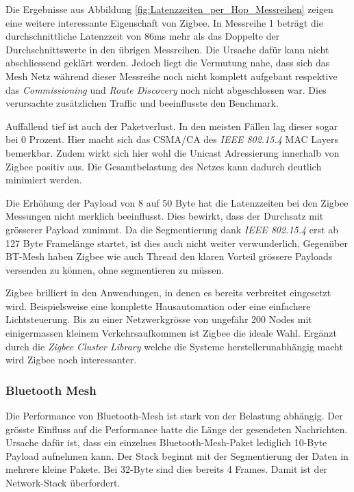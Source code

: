 Die Ergebnisse aus Abbildung \ref{fig:Latenzzeiten_per_Hop_Messreihen} zeigen eine weitere interessante Eigenschaft von Zigbee.
In Messreihe 1 beträgt die durchschnittliche Latenzzeit von 86ms mehr als das Doppelte der Durchschnittswerte in den übrigen Messreihen.
Die Ursache dafür kann nicht abschliessend geklärt werden.
Jedoch liegt die Vermutung nahe, dass sich das Mesh Netz während dieser Messreihe noch nicht komplett aufgebaut respektive das \textit{Commissioning} und \textit{Route Discovery} noch nicht abgeschlossen war.
Dies verursachte zusätzlichen Traffic und beeinflusste den Benchmark.

Auffallend tief ist auch der Paketverlust.
In den meisten Fällen lag dieser sogar bei 0 Prozent.
Hier macht sich das CSMA\slash CA des \textit{IEEE 802.15.4} MAC Layers bemerkbar.
Zudem wirkt sich hier wohl die Unicast Adressierung innerhalb von Zigbee positiv aus.
Die Gesamtbelastung des Netzes kann dadurch deutlich minimiert werden.

Die Erhöhung der Payload von 8 auf 50 Byte hat die Latenzzeiten bei den Zigbee Messungen nicht merklich beeinflusst.
Dies bewirkt, dass der Durchsatz mit grösserer Payload zunimmt.
Da die Segmentierung dank \textit{IEEE 802.15.4} erst ab 127 Byte Framelänge startet, ist dies auch nicht weiter verwunderlich.
Gegenüber BT-Mesh haben Zigbee wie auch Thread den klaren Vorteil grössere Payloads versenden zu können, ohne segmentieren zu müssen.

Zigbee brilliert in den Anwendungen, in denen es bereits verbreitet eingesetzt wird.
Beispielsweise eine komplette Hausautomation oder eine einfachere Lichtsteuerung.
Bis zu einer Netzwerkgrösse von ungefähr 200 Nodes mit einigermassen kleinem Verkehrsaufkommen ist Zigbee die ideale Wahl.
Ergänzt durch die \textit{Zigbee Cluster Library} welche die Systeme herstellerunabhängig macht wird Zigbee noch interessanter.


\subsubsection{Bluetooth Mesh}\label{subsubsec:FazitBluetoothMesh}
Die Performance von Bluetooth-Mesh ist stark von der Belastung abhängig.
Der grösste Einfluss auf die Performance hatte die Länge der gesendeten Nachrichten.
Ursache dafür ist, dass ein einzelnes Bluetooth-Mesh-Paket lediglich 10-Byte Payload aufnehmen kann. Der Stack beginnt mit der Segmentierung der Daten in mehrere kleine Pakete. Bei 32-Byte sind dies bereits 4 Frames. Damit ist der Network-Stack überfordert. 

